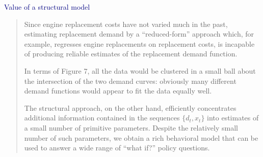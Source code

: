 \documentclass[aspectratio=169]{beamer}
\begin{document}
\begin{frame}

\textcolor{navy}{Value of a structural model}
\bigskip{}

\begin{quote}
Since engine replacement costs have not varied much in the past, estimating replacement demand by a ``reduced-form'' approach which, for example, regresses engine replacements on replacement costs, is incapable of producing reliable estimates of the replacement demand function.

\bigskip{}

In terms of Figure 7, all the data would be clustered in a small ball about the intersection of the two demand curves: obviously many different demand functions would appear to fit the data equally well. 

\bigskip{}

The structural approach, on the other hand, efficiently concentrates additional information contained in the sequences $\{d_t, x_t\}$ into estimates of a small number of primitive parameters. Despite the relatively small number of such parameters, we obtain a rich behavioral model that can be used to answer a wide range of ``what if?'' policy questions.
\end{quote}    
\end{frame}
\end{document}
